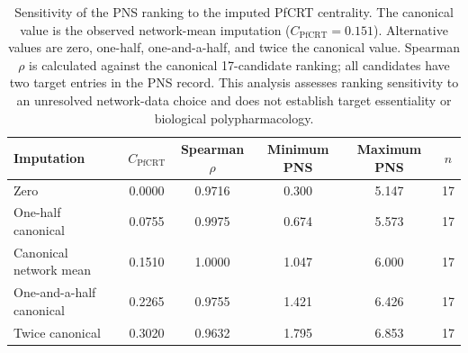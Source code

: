 \begin{table}[htbp]
\centering
\caption{Sensitivity of the PNS ranking to the imputed PfCRT centrality. The canonical value is the observed network-mean imputation ($C_{\mathrm{PfCRT}}=\num{0.151}$). Alternative values are zero, one-half, one-and-a-half, and twice the canonical value. Spearman $\rho$ is calculated against the canonical 17-candidate ranking; all candidates have two target entries in the PNS record. This analysis assesses ranking sensitivity to an unresolved network-data choice and does not establish target essentiality or biological polypharmacology.}
\label{tab:s7_pns_sensitivity}
\scriptsize
\begin{tabular}{l S[table-format=1.4] S[table-format=1.4] S[table-format=1.3] S[table-format=1.3] S[table-format=2.0]}
\toprule
Imputation & {$C_{\mathrm{PfCRT}}$} & {Spearman $\rho$} & {Minimum PNS} & {Maximum PNS} & {$n$} \\
\midrule
Zero & 0.0000 & 0.9716 & 0.300 & 5.147 & 17 \\
One-half canonical & 0.0755 & 0.9975 & 0.674 & 5.573 & 17 \\
Canonical network mean & 0.1510 & 1.0000 & 1.047 & 6.000 & 17 \\
One-and-a-half canonical & 0.2265 & 0.9755 & 1.421 & 6.426 & 17 \\
Twice canonical & 0.3020 & 0.9632 & 1.795 & 6.853 & 17 \\
\bottomrule
\end{tabular}
\end{table}
